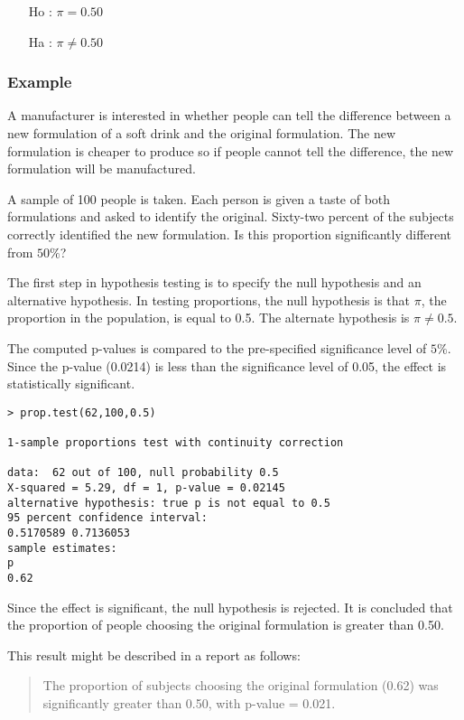 \begin{itemize}
	\item[Ho] : $\pi = 0.50$
	\item[Ha] : $\pi \neq 0.50$
\end{itemize}

\subsubsection{Example}
A manufacturer is interested in whether people can tell the difference between a new formulation of a soft drink and the original formulation. The new formulation is cheaper to produce so if people cannot tell the difference, the new formulation will be manufactured. 

A sample of 100 people is taken. Each person is given a taste of both formulations and asked to identify the original. Sixty-two percent of the subjects correctly identified the new formulation. Is this proportion significantly different from $50\%$? 

The first step in hypothesis testing is to specify the null hypothesis and an alternative hypothesis. In testing proportions, the null hypothesis is that $\pi$, the proportion in the population, is equal to 0.5. The alternate hypothesis is $\pi \neq 0.5$. 

The computed p-values is compared to the pre-specified significance level of $5\%$. Since the p-value (0.0214) is less than the significance level of 0.05, the effect is statistically significant. 

\begin{verbatim}
> prop.test(62,100,0.5)

1-sample proportions test with continuity correction

data:  62 out of 100, null probability 0.5 
X-squared = 5.29, df = 1, p-value = 0.02145
alternative hypothesis: true p is not equal to 0.5 
95 percent confidence interval:
0.5170589 0.7136053 
sample estimates:
p 
0.62 
\end{verbatim}

Since the effect is significant, the null hypothesis is rejected. It is concluded that the proportion of people choosing the original formulation is greater than 0.50. 

This result might be described in a report as follows: 

\begin{quote}
	The proportion of subjects choosing the original formulation (0.62) was significantly greater than 0.50, with p-value = 0.021.
\end{quote}  


